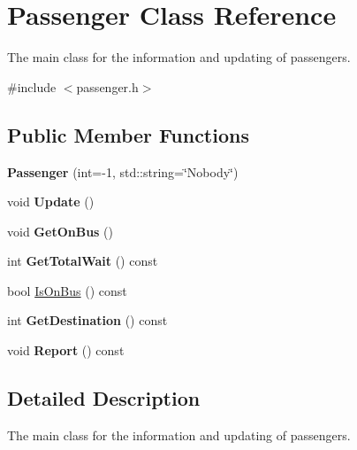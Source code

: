 \hypertarget{classPassenger}{}\section{Passenger Class Reference}
\label{classPassenger}


The main class for the information and updating of passengers.  




{\ttfamily \#include $<$passenger.\+h$>$}

\subsection*{Public Member Functions}
\begin{DoxyCompactItemize}
\item 
\mbox{\label{classPassenger_a5c3addb9a6fd03e5e5642ed844e2702c}} 
{\bfseries Passenger} (int=-\/1, std\+::string=\char`\"{}Nobody\char`\"{})
\item 
\mbox{\label{classPassenger_a960de3b29fc17a2c2d79c0b79d5cf299}} 
void {\bfseries Update} ()
\item 
\mbox{\label{classPassenger_ae2ba639cfef39781ac079778578bd9fe}} 
void {\bfseries Get\+On\+Bus} ()
\item 
\mbox{\label{classPassenger_a25158560f790ef7ef06d94c414b34f25}} 
int {\bfseries Get\+Total\+Wait} () const
\item 
bool \hyperlink{classPassenger_a2acf008ec444afcc859b914ee24add0e}{Is\+On\+Bus} () const
\item 
\mbox{\label{classPassenger_a49db0ee527377aae6077df190a11501c}} 
int {\bfseries Get\+Destination} () const
\item 
\mbox{\label{classPassenger_ac54ce797e412a4895febe10f07dc5df5}} 
void {\bfseries Report} () const
\end{DoxyCompactItemize}


\subsection{Detailed Description}
The main class for the information and updating of passengers. 

